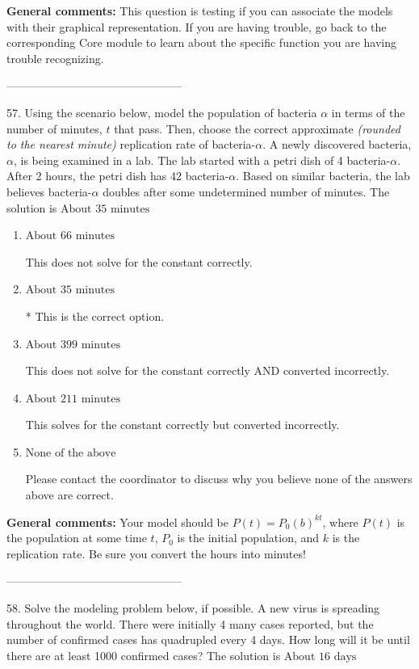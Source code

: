 \documentclass{extbook}[14pt]
\begin{document}
\textbf{General comments:} This question is testing if you can associate the models with their graphical representation. If you are having trouble, go back to the corresponding Core module to learn about the specific function you are having trouble recognizing.

-----------------------------------------------

57. Using the scenario below, model the population of bacteria $\alpha$ in terms of the number of minutes, $t$ that pass. Then, choose the correct approximate \textit{(rounded to the nearest minute)} replication rate of bacteria-$\alpha$.
A newly discovered bacteria, $\alpha$, is being examined in a lab. The lab started with a petri dish of 4 bacteria-$\alpha$. After 2 hours, the petri dish has 42 bacteria-$\alpha$. Based on similar bacteria, the lab believes bacteria-$\alpha$ doubles after some undetermined number of minutes. 
The solution is $ \text{About } 35 \text{ minutes} $ 

\begin{enumerate}[label=\Alph*.] 
\item $ \text{About } 66 \text{ minutes} $ 

 This does not solve for the constant correctly. 
\item $ \text{About } 35 \text{ minutes} $ 

 * This is the correct option. 
\item $ \text{About } 399 \text{ minutes} $ 

 This does not solve for the constant correctly AND converted incorrectly. 
\item $ \text{About } 211 \text{ minutes} $ 

 This solves for the constant correctly but converted incorrectly. 
\item $ \text{None of the above} $ 

 Please contact the coordinator to discuss why you believe none of the answers above are correct. 
\end{enumerate} 
 
\textbf{General comments:} Your model should be $P(t) = P_0(b)^{kt}$, where $P(t)$ is the population at some time $t$, $P_0$ is the initial population, and $k$ is the replication rate. Be sure you convert the hours into minutes!

-----------------------------------------------

58. Solve the modeling problem below, if possible.
A new virus is spreading throughout the world. There were initially 4 many cases reported, but the number of confirmed cases has quadrupled every 4 days. How long will it be until there are at least 1000 confirmed cases? 
The solution is $ \text{About } 16 \text{ days} $ 
\end{document}
